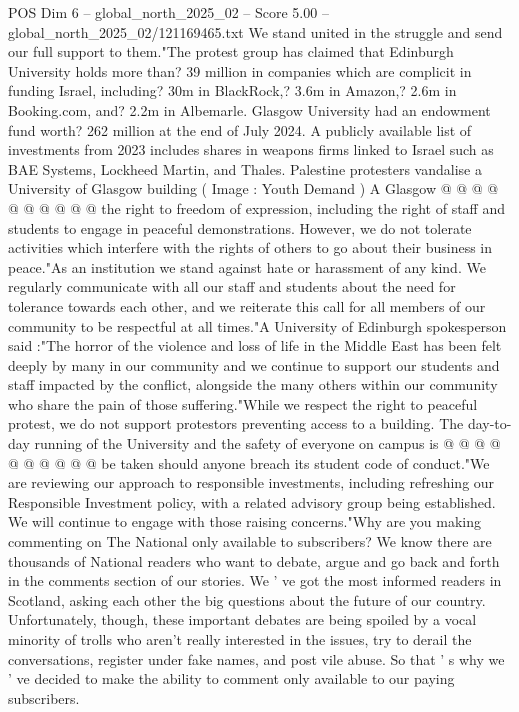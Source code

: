 \begin{textsample}{POS Dim 6 – global\_north\_2025\_02 – Score 5.00 – global\_north\_2025\_02/121169465.txt}
We stand united in the struggle and send our full support to them."The protest group has claimed that Edinburgh University holds more than? 39 million in companies which are complicit in funding Israel, including? 30m in BlackRock,? 3.6m in Amazon,? 2.6m in Booking.com, and? 2.2m in Albemarle.
Glasgow University had an endowment fund worth? 262 million at the end of July 2024.
A publicly available list of investments from 2023 includes shares in weapons firms linked to Israel such as BAE Systems, Lockheed Martin, and Thales.
Palestine protesters vandalise a University of Glasgow building ( Image : Youth Demand ) A Glasgow @ @ @ @ @ @ @ @ @ @ the right to freedom of expression, including the right of staff and students to engage in peaceful demonstrations.
However, we do not tolerate activities which interfere with the rights of others to go about their business in peace."As an institution we stand against hate or harassment of any kind.
We regularly communicate with all our staff and students about the need for tolerance towards each other, and we reiterate this call for all members of our community to be respectful at all times."A University of Edinburgh spokesperson said :"The horror of the violence and loss of life in the Middle East has been felt deeply by many in our community and we continue to support our students and staff impacted by the conflict, alongside the many others within our community who share the pain of those suffering."While we respect the right to peaceful protest, we do not support protestors preventing access to a building.
The day-to-day running of the University and the safety of everyone on campus is @ @ @ @ @ @ @ @ @ @ be taken should anyone breach its student code of conduct."We are reviewing our approach to responsible investments, including refreshing our Responsible Investment policy, with a related advisory group being established.
We will continue to engage with those raising concerns."Why are you making commenting on The National only available to subscribers?
We know there are thousands of National readers who want to debate, argue and go back and forth in the comments section of our stories.
We ' ve got the most informed readers in Scotland, asking each other the big questions about the future of our country.
Unfortunately, though, these important debates are being spoiled by a vocal minority of trolls who aren't really interested in the issues, try to derail the conversations, register under fake names, and post vile abuse.
So that ' s why we ' ve decided to make the ability to comment only available to our paying subscribers.

\end{textsample}
